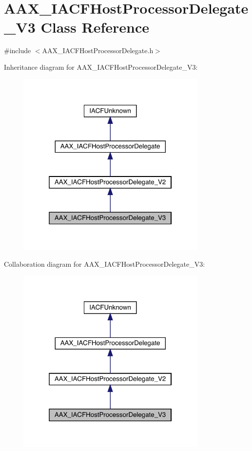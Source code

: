 \hypertarget{a01709}{}\section{A\+A\+X\+\_\+\+I\+A\+C\+F\+Host\+Processor\+Delegate\+\_\+\+V3 Class Reference}
\label{a01709}


{\ttfamily \#include $<$A\+A\+X\+\_\+\+I\+A\+C\+F\+Host\+Processor\+Delegate.\+h$>$}



Inheritance diagram for A\+A\+X\+\_\+\+I\+A\+C\+F\+Host\+Processor\+Delegate\+\_\+\+V3\+:
\nopagebreak
\begin{figure}[H]
\begin{center}
\leavevmode
\includegraphics[width=268pt]{a01708}
\end{center}
\end{figure}


Collaboration diagram for A\+A\+X\+\_\+\+I\+A\+C\+F\+Host\+Processor\+Delegate\+\_\+\+V3\+:
\nopagebreak
\begin{figure}[H]
\begin{center}
\leavevmode
\includegraphics[width=268pt]{a01707}
\end{center}
\end{figure}


